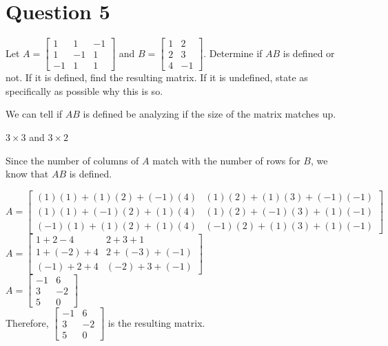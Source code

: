 \documentclass{report}
\begin{document}
\section*{Question 5}
\begin{example}
    Let $A = \begin{bmatrix} 1 & 1 & -1 \\ 1 & -1 & 1 \\ -1 & 1 & 1 \end{bmatrix}$ and $B = \begin{bmatrix} 1 & 2 \\ 2 & 3 \\ 4 & -1 \end{bmatrix}$. Determine if $AB$ is defined or not. If it is defined, find the resulting matrix. If it is undefined, state as specifically as possible why this is so.
\end{example}
We can tell if $AB$ is defined be analyzing if the size of the matrix matches up.
\begin{center}
    $3\times 3$ and $3\times 2$
\end{center}
Since the number of columns of $A$ match with the number of rows for $B$, we know that $AB$ is defined.\\
\begin{center}
    $A = \begin{bmatrix} 
        (1)(1)+(1)(2)+(-1)(4) & (1)(2)+(1)(3)+(-1)(-1) \\ 
        (1)(1)+(-1)(2)+(1)(4) & (1)(2)+(-1)(3)+(1)(-1) \\ 
        (-1)(1)+(1)(2)+(1)(4) & (-1)(2)+(1)(3)+(1)(-1) 
    \end{bmatrix}$\\\vspace{3mm}
    $A = \begin{bmatrix} 
        1+2-4 & 2+3+1 \\ 
        1+(-2)+4 & 2+(-3)+(-1) \\ 
        (-1)+2+4 & (-2)+3+(-1) 
    \end{bmatrix}$\\\vspace{3mm}
    $A = \begin{bmatrix} 
        -1 & 6 \\ 
        3 & -2 \\ 
        5 & 0 
    \end{bmatrix}$\\\vspace{3mm}
Therefore, $\begin{bmatrix} -1 & 6 \\ 3 & -2 \\ 5 & 0 \end{bmatrix}$ is the resulting matrix.
\end{center}
\clearpage
\end{document}
